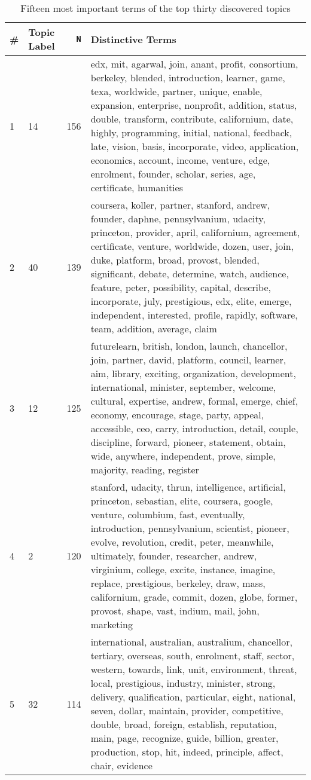 \begin{table}[ht]
\centering
\caption{Fifteen most important terms of the top thirty discovered topics} 
\label{tab:topic_terms}
{\footnotesize
\begin{tabularx}{\textwidth}{llrX}
  \toprule
\# & Topic Label & \texttt{N} & Distinctive Terms \\ 
  \midrule
  1 & 14 & 156 & edx, mit, agarwal, join, anant, profit, consortium, berkeley, blended, introduction, learner, game, texa, worldwide, partner, unique, enable, expansion, enterprise, nonprofit, addition, status, double, transform, contribute, californium, date, highly, programming, initial, national, feedback, late, vision, basis, incorporate, video, application, economics, account, income, venture, edge, enrolment, founder, scholar, series, age, certificate, humanities \\ 
    2 & 40 & 139 & coursera, koller, partner, stanford, andrew, founder, daphne, pennsylvanium, udacity, princeton, provider, april, californium, agreement, certificate, venture, worldwide, dozen, user, join, duke, platform, broad, provost, blended, significant, debate, determine, watch, audience, feature, peter, possibility, capital, describe, incorporate, july, prestigious, edx, elite, emerge, independent, interested, profile, rapidly, software, team, addition, average, claim \\ 
    3 & 12 & 125 & futurelearn, british, london, launch, chancellor, join, partner, david, platform, council, learner, aim, library, exciting, organization, development, international, minister, september, welcome, cultural, expertise, andrew, formal, emerge, chief, economy, encourage, stage, party, appeal, accessible, ceo, carry, introduction, detail, couple, discipline, forward, pioneer, statement, obtain, wide, anywhere, independent, prove, simple, majority, reading, register \\ 
    4 & 2 & 120 & stanford, udacity, thrun, intelligence, artificial, princeton, sebastian, elite, coursera, google, venture, columbium, fast, eventually, introduction, pennsylvanium, scientist, pioneer, evolve, revolution, credit, peter, meanwhile, ultimately, founder, researcher, andrew, virginium, college, excite, instance, imagine, replace, prestigious, berkeley, draw, mass, californium, grade, commit, dozen, globe, former, provost, shape, vast, indium, mail, john, marketing \\ 
    5 & 32 & 114 & international, australian, australium, chancellor, tertiary, overseas, south, enrolment, staff, sector, western, towards, link, unit, environment, threat, local, prestigious, industry, minister, strong, delivery, qualification, particular, eight, national, seven, dollar, maintain, provider, competitive, double, broad, foreign, establish, reputation, main, page, recognize, guide, billion, greater, production, stop, hit, indeed, principle, affect, chair, evidence \\ 

\end{tabularx}}
\end{table}
